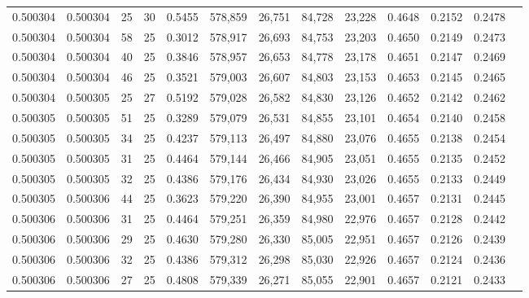 \begin{tabular}{rrrrrrrrrrrrr}
0.500304 & 0.500304 &    25 &  30 &                                     0.5455 & 578,859 &  26,751 &  84,728 &  23,228 & 0.4648 & 0.2152 & 0.2478 \\
0.500304 & 0.500304 &    58 &  25 &                                     0.3012 & 578,917 &  26,693 &  84,753 &  23,203 & 0.4650 & 0.2149 & 0.2473 \\
0.500304 & 0.500304 &    40 &  25 &                                     0.3846 & 578,957 &  26,653 &  84,778 &  23,178 & 0.4651 & 0.2147 & 0.2469 \\
0.500304 & 0.500304 &    46 &  25 &                                     0.3521 & 579,003 &  26,607 &  84,803 &  23,153 & 0.4653 & 0.2145 & 0.2465 \\
0.500304 & 0.500305 &    25 &  27 &                                     0.5192 & 579,028 &  26,582 &  84,830 &  23,126 & 0.4652 & 0.2142 & 0.2462 \\
0.500305 & 0.500305 &    51 &  25 &                                     0.3289 & 579,079 &  26,531 &  84,855 &  23,101 & 0.4654 & 0.2140 & 0.2458 \\
0.500305 & 0.500305 &    34 &  25 &                                     0.4237 & 579,113 &  26,497 &  84,880 &  23,076 & 0.4655 & 0.2138 & 0.2454 \\
0.500305 & 0.500305 &    31 &  25 &                                     0.4464 & 579,144 &  26,466 &  84,905 &  23,051 & 0.4655 & 0.2135 & 0.2452 \\
0.500305 & 0.500305 &    32 &  25 &                                     0.4386 & 579,176 &  26,434 &  84,930 &  23,026 & 0.4655 & 0.2133 & 0.2449 \\
0.500305 & 0.500306 &    44 &  25 &                                     0.3623 & 579,220 &  26,390 &  84,955 &  23,001 & 0.4657 & 0.2131 & 0.2445 \\
0.500306 & 0.500306 &    31 &  25 &                                     0.4464 & 579,251 &  26,359 &  84,980 &  22,976 & 0.4657 & 0.2128 & 0.2442 \\
0.500306 & 0.500306 &    29 &  25 &                                     0.4630 & 579,280 &  26,330 &  85,005 &  22,951 & 0.4657 & 0.2126 & 0.2439 \\
0.500306 & 0.500306 &    32 &  25 &                                     0.4386 & 579,312 &  26,298 &  85,030 &  22,926 & 0.4657 & 0.2124 & 0.2436 \\
0.500306 & 0.500306 &    27 &  25 &                                     0.4808 & 579,339 &  26,271 &  85,055 &  22,901 & 0.4657 & 0.2121 & 0.2433 \\

\end{tabular}
